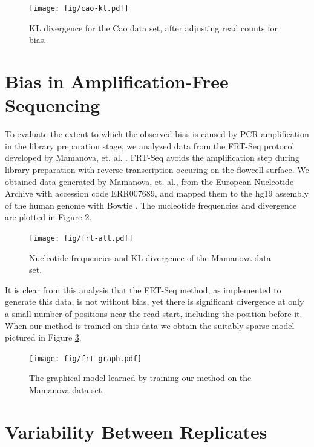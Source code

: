 \documentclass[letterpaper]{article}
\begin{document}
\begin{figure}[H]
\begin{center}
\texttt{[image: fig/cao-kl.pdf]}
\end{center}
\caption{KL divergence for the Cao data set, after adjusting read counts for
bias.}
\label{fig:caokl}
\end{figure}




\section{Bias in Amplification-Free Sequencing}

To evaluate the extent to which the observed bias is caused by PCR amplification
in the library preparation stage, we analyzed data from the FRT-Seq protocol
developed by Mamanova, et. al. \cite{Mamanova2010}. FRT-Seq avoids the
amplification step during library preparation with reverse transcription
occuring on the flowcell surface. We obtained data generated by Mamanova, et.
al., from the European Nucleotide Archive with accession code ERR007689, and
mapped them to the hg19 assembly of the human genome with Bowtie
\cite{Langmead2009}. The nucleotide frequencies and divergence are plotted
in Figure \ref{fig:frtall}.

\begin{figure}[H]
\begin{center}
\texttt{[image: fig/frt-all.pdf]}
\end{center}
\caption{Nucleotide frequencies and KL divergence of the Mamanova data set.}
\label{fig:frtall}
\end{figure}

It is clear from this analysis that the FRT-Seq method, as implemented to
generate this data, is not without bias, yet there is significant divergence at
only a small number of positions near the read start, including the position
before it. When our method is trained on this data we obtain the suitably sparse
model pictured in Figure
\ref{fig:frtgraph}.

\begin{figure}[H]
\begin{center}
\texttt{[image: fig/frt-graph.pdf]}
\end{center}
\caption{The graphical model learned by training our method on the Mamanova data
set.}
\label{fig:frtgraph}
\end{figure}


\section{Variability Between Replicates}
\end{document}
